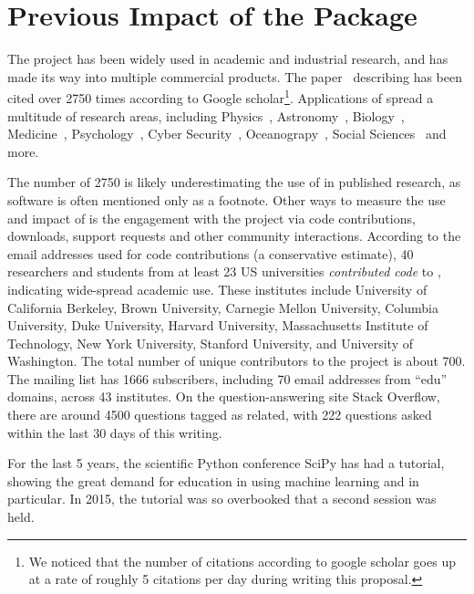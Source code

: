 \section{Previous Impact of the \sklearn{} Package}
The \sklearn{} project has been widely used in academic and industrial research,
and has made its way into multiple commercial products. The
paper~\autocite{pedregosa2011scikit} describing \sklearn{} has been cited over 2750 times
according to Google scholar\footnote{We noticed that the number of citations
according to google scholar goes up at a rate of roughly 5 citations per day
during writing this proposal.}. Applications of \sklearn{} spread a multitude
of research areas, including Physics~\autocite{Baldi:2016fql, Yang:2016nnd},
Astronomy~\autocite{pereira2013spectrophotometric, bennett20141},
Biology~\autocite{misof2014phylogenomics, ritchie2014functional},
Medicine~\autocite{kamalov2015improving, ng2015computer},
Psychology~\autocite{park2015automatic,doehrmann2013predicting}, Cyber
Security~\autocite{sahs2012machine},
Oceanograpy~\autocite{sunagawa2015structure}, Social
Sciences~\autocite{driscoll2015searching, croicu2015improving} and more.

The number of 2750 is likely underestimating the use of \sklearn{} in published
research, as software is often mentioned only as a footnote.
Other ways to measure the use and impact of \sklearn{} is the engagement with
the project via code contributions, downloads, support requests and other
community interactions.
According to the email addresses used for code contributions (a conservative
estimate), 40 researchers and students from at least 23 US universities
\emph{contributed code} to \sklearn{}, indicating wide-spread academic use.
These institutes include University of California Berkeley, Brown University,
Carnegie Mellon University, Columbia University, Duke University, Harvard
University, Massachusetts Institute of Technology, New York University,
Stanford University, and University of Washington.
The total number of unique contributors to the project is about 700.
%
The \sklearn{} mailing list has 1666 subscribers, including 70 email
addresses from ``edu'' domains, across 43 institutes.
%
On the question-answering site Stack Overflow, there are around 4500 questions
tagged as \sklearn{} related, with 222 questions asked within the last 30
days of this writing.

For the last 5 years, the scientific Python conference SciPy has had a \sklearn{} tutorial,
showing the great demand for education in using machine learning and \sklearn{} in particular.
In 2015, the tutorial was so overbooked that a second session was held.

